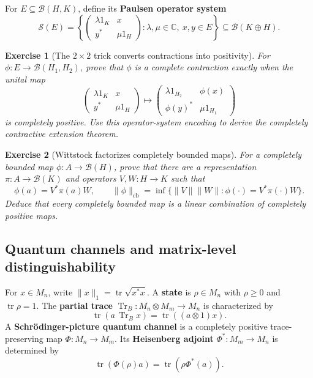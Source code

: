 \documentclass{article}
\newtheorem{exercise}{Exercise}
\newcommand{\trace}{\operatorname{tr}}
\begin{document}
For $E\subseteq\mathcal B(H,K)$, define its \textbf{Paulsen operator system}
\[
\mathcal S(E)=
\left\{
\begin{pmatrix}
\lambda1_K&x\\
y^*&\mu1_H
\end{pmatrix}:
\lambda,\mu\in\mathbb C,\ x,y\in E
\right\}
\subseteq\mathcal B(K\oplus H).
\]

\begin{exercise}[The $2\times2$ trick converts contractions into positivity]
\leavevmode\par
\textit{For $\phi:E\to\mathcal B(H_1,H_2)$, prove that $\phi$ is a complete
contraction exactly when the unital map}
\[
\begin{pmatrix}\lambda1_K&x\\y^*&\mu1_H\end{pmatrix}
\longmapsto
\begin{pmatrix}\lambda1_{H_2}&\phi(x)\\
\phi(y)^*&\mu1_{H_1}\end{pmatrix}
\]
\textit{is completely positive. Use this operator-system encoding to derive
the completely contractive extension theorem.}
\end{exercise}

\begin{exercise}[Wittstock factorizes completely bounded maps]
\leavevmode\par
\textit{For a completely bounded map
$\phi:A\to\mathcal B(H)$, prove that there are a representation
$\pi:A\to\mathcal B(K)$ and operators $V,W:H\to K$ such that}
\cite{wittstock}
\[
\phi(a)=V^*\pi(a)W,
\qquad
\|\phi\|_{\mathrm{cb}}
=\inf\{\|V\|\|W\|:\phi(\mathord{\cdot})=V^*\pi(\mathord{\cdot})W\}.
\]
\textit{Deduce that every completely bounded map is a linear combination of
completely positive maps.}
\end{exercise}

\subsection{Quantum channels and matrix-level distinguishability}

For $x\in M_n$, write $\|x\|_1=\trace\sqrt{x^*x}$. A
\textbf{state} is $\rho\in M_n$ with $\rho\geq0$ and $\trace\rho=1$. The
\textbf{partial trace} $\operatorname{Tr}_B:M_n\otimes M_m\to M_n$ is
characterized by
\[
\trace\!\left(a\,\operatorname{Tr}_B x\right)
=\trace\!\left((a\otimes1)x\right).
\]
A \textbf{Schr\"odinger-picture quantum channel} is a completely positive
trace-preserving map $\Phi:M_n\to M_m$. Its
\textbf{Heisenberg adjoint} $\Phi^*:M_m\to M_n$ is determined by
\[
\trace(\Phi(\rho)a)=\trace(\rho\Phi^*(a)).
\]
\end{document}
